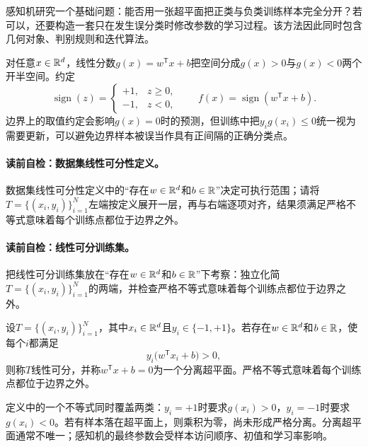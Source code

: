 \label{struct:V2-C01-CH06}
感知机研究一个基础问题：能否用一张超平面把正类与负类训练样本完全分开？若可以，还要构造一套只在发生误分类时修改参数的学习过程。该方法因此同时包含几何对象、判别规则和迭代算法。

对任意$x\in\mathbb{R}^d$，线性分数$g(x)=w^{\mathsf T}x+b$把空间分成$g(x)>0$与$g(x)<0$两个开半空间。约定
\[
\operatorname{sign}(z)=
\begin{cases}
+1,&z\ge 0,\\
-1,&z<0,
\end{cases}
\qquad f(x)=\operatorname{sign}(w^{\mathsf T}x+b).
\]
边界上的取值约定会影响$g(x)=0$时的预测，但训练中把$y_i g(x_i)\le0$统一视为需要更新，可以避免边界样本被误当作具有正间隔的正确分类点。

\paragraph{读前自检：数据集线性可分性定义。}数据集线性可分性定义中的“存在$w\in\mathbb{R}^d$和$b\in\mathbb{R}$”决定可执行范围；请将$T=\{(x_i,y_i)\}_{i=1}^{N}$左端按定义展开一层，再与右端逐项对齐，结果须满足严格不等式意味着每个训练点都位于边界之外。\par

\label{struct:V2-C01-CH07}
\paragraph{读前自检：线性可分训练集。}把线性可分训练集放在“存在$w\in\mathbb{R}^d$和$b\in\mathbb{R}$”下考察：独立化简$T=\{(x_i,y_i)\}_{i=1}^{N}$的两端，并检查严格不等式意味着每个训练点都位于边界之外。\par

\begin{definition}[线性可分训练集]\label{def:V2-C01-separable}
设$T=\{(x_i,y_i)\}_{i=1}^{N}$，其中$x_i\in\mathbb{R}^d$且$y_i\in\{-1,+1\}$。若存在$w\in\mathbb{R}^d$和$b\in\mathbb{R}$，使每个$i$都满足
\[
y_i\bigl(w^{\mathsf T}x_i+b\bigr)>0,
\]
则称$T$线性可分，并称$w^{\mathsf T}x+b=0$为一个分离超平面。严格不等式意味着每个训练点都位于边界之外。
\end{definition}

定义中的一个不等式同时覆盖两类：$y_i=+1$时要求$g(x_i)>0$，$y_i=-1$时要求$g(x_i)<0$。若有样本落在超平面上，则乘积为零，尚未形成严格分离。分离超平面通常不唯一；感知机的最终参数会受样本访问顺序、初值和学习率影响。


